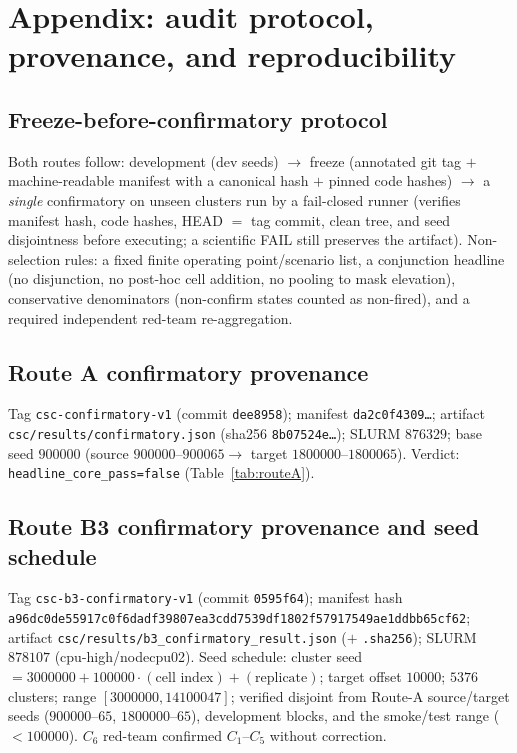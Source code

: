 \section{Appendix: audit protocol, provenance, and reproducibility}
\label{app:audit}

\subsection{Freeze-before-confirmatory protocol}
Both routes follow: development (dev seeds) $\rightarrow$ freeze (annotated git tag $+$ machine-readable
manifest with a canonical hash $+$ pinned code hashes) $\rightarrow$ a \emph{single} confirmatory on unseen
clusters run by a fail-closed runner (verifies manifest hash, code hashes, HEAD $=$ tag commit, clean tree,
and seed disjointness before executing; a scientific FAIL still preserves the artifact). Non-selection
rules: a fixed finite operating point/scenario list, a conjunction headline (no disjunction, no post-hoc
cell addition, no pooling to mask elevation), conservative denominators (non-confirm states counted as
non-fired), and a required independent red-team re-aggregation.

\subsection{Route A confirmatory provenance}
Tag \texttt{csc-confirmatory-v1} (commit \texttt{dee8958}); manifest \texttt{da2c0f4309\dots}; artifact
\texttt{csc/results/confirmatory.json} (sha256 \texttt{8b07524e\dots}); SLURM $876329$; base seed $900000$
(source $900000\text{--}900065 \rightarrow$ target $1800000\text{--}1800065$). Verdict:
\texttt{headline\_core\_pass=false} (Table~\ref{tab:routeA}).

\subsection{Route B3 confirmatory provenance and seed schedule}
Tag \texttt{csc-b3-confirmatory-v1} (commit \texttt{0595f64}); manifest hash
\texttt{a96dc0de55917c0f6dadf39807ea3cdd7539df1802f57917549ae1ddbb65cf62}; artifact
\texttt{csc/results/b3\_confirmatory\_result.json} ($+$ \texttt{.sha256}); SLURM $878107$
(cpu-high/nodecpu02). Seed schedule: cluster seed $=3000000 + 100000\cdot(\text{cell index}) +
(\text{replicate})$; target offset $10000$; $5376$ clusters; range $[3000000,14100047]$; verified disjoint
from Route-A source/target seeds ($900000\text{--}65$, $1800000\text{--}65$), development blocks, and the
smoke/test range ($<100000$). $C_6$ red-team confirmed $C_1$--$C_5$ without correction.

